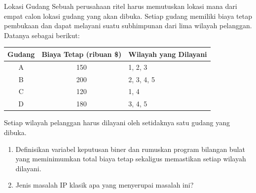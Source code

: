 \begin{ex}{Lokasi Gudang}{}
\label{ex:warehouse-cover}
 Sebuah perusahaan ritel harus memutuskan lokasi mana dari empat calon lokasi gudang yang akan dibuka. Setiap gudang memiliki biaya tetap pembukaan dan dapat melayani suatu subhimpunan dari lima wilayah pelanggan. Datanya sebagai berikut:

\begin{center}
\begin{tabular}{c|c|l}
\textbf{Gudang} & \textbf{Biaya Tetap (ribuan \$)} & \textbf{Wilayah yang Dilayani} \\
\hline
A & 150 & 1, 2, 3 \\
B & 200 & 2, 3, 4, 5 \\
C & 120 & 1, 4 \\
D & 180 & 3, 4, 5 \\
\end{tabular}
\par{}\label{tab:integerProgrammingFormulations-book1-tab04}%

\end{center}

Setiap wilayah pelanggan harus dilayani oleh setidaknya satu gudang yang dibuka.

\begin{enumerate}
\item Definisikan variabel keputusan biner dan rumuskan program bilangan bulat yang meminimumkan total biaya tetap sekaligus memastikan setiap wilayah dilayani.
\item Jenis masalah IP klasik apa yang menyerupai masalah ini?
\end{enumerate}
\end{ex}


